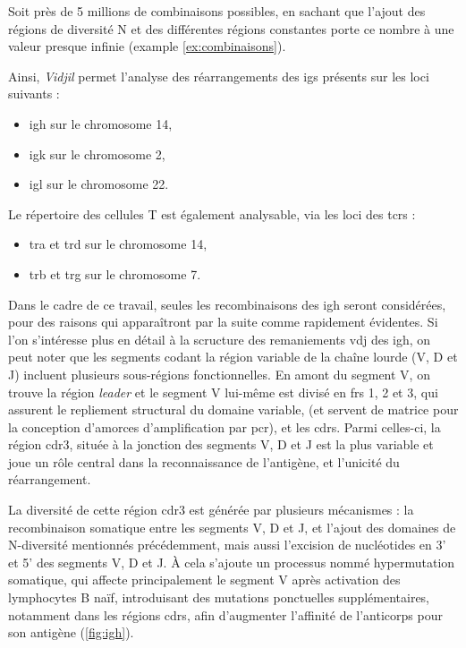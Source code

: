 Soit près de 5 millions de combinaisons possibles, en sachant que l'ajout des régions de diversité N
et des différentes régions constantes porte ce nombre à une valeur presque infinie (example \autoref{ex:combinaisons}).

\vspace{1em}

Ainsi, \textit{Vidjil} permet l'analyse des réarrangements des \glspl{ig} présents sur les loci suivants : 
\begin{itemize}
    \item \gls{igh} sur le chromosome 14, 
    \item \gls{igk} sur le chromosome 2, 
    \item \gls{igl} sur le chromosome 22.
\end{itemize}

\vspace{1em}

Le répertoire des cellules T est également analysable, via les loci des \glspl{tcr} :
\begin{itemize}
    \item \gls{tra} et \gls{trd} sur le chromosome 14, 
    \item \gls{trb} et \gls{trg} sur le chromosome 7.
\end{itemize}



Dans le cadre de ce travail, seules les recombinaisons des \gls{igh} seront considérées,
pour des raisons qui apparaîtront par la suite comme rapidement évidentes.
Si l'on s'intéresse plus en détail à la scructure des remaniements \gls{vdj} des \gls{igh},
on peut noter que les segments codant la région variable de la chaîne lourde (V, D et J)
incluent plusieurs sous-régions fonctionnelles. En amont du segment V, on trouve la région \textit{leader} et 
le segment V lui-même est divisé en \glspl{fr} 1, 2 et 3, qui assurent le repliement structural du domaine variable, 
(et servent de matrice pour la conception d'amorces d'amplification par \gls{pcr}), 
et les \glspl{cdr}. Parmi celles-ci, la région \gls{cdr}3, située à la jonction des segments V, D et J 
est la plus variable et joue un rôle central dans la reconnaissance de l'antigène, et l'unicité du réarrangement.

\vspace{1em}

La diversité de cette région \gls{cdr}3 est générée par plusieurs mécanismes :
la recombinaison somatique entre les segments V, D et J, et l'ajout des domaines de N-diversité 
mentionnés précédemment, mais aussi l'excision de nucléotides en 3' et 5' des segments V, D et J.
À cela s'ajoute un processus nommé hypermutation somatique, qui affecte principalement le segment V 
après activation des lymphocytes B naïf, introduisant des mutations ponctuelles supplémentaires,
notamment dans les régions \glspl{cdr}, afin d'augmenter l'affinité de l'anticorps pour son antigène (\autoref{fig:igh}).

